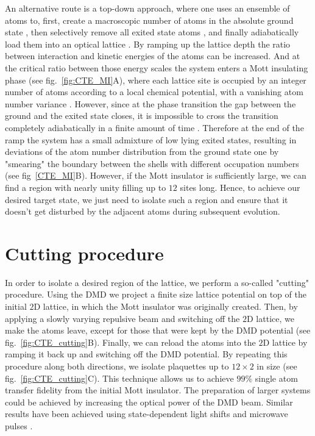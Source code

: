An alternative route is a top-down approach, where one uses an ensemble of atoms to, first, create a macroscopic number of atoms in the absolute ground state \cite{BEC, DFG}, then selectively remove all exited state atoms \cite{ammy's thesis}, and finally adiabatically load them into an optical lattice \cite{Greiner2002}. By ramping up the lattice depth the ratio between interaction and kinetic energies of the atoms can be increased. And at the critical ratio between those energy scales the system enters a Mott insulating phase (see fig.~\ref{fig:CTE_MI}A), where each lattice site is occupied by an integer number of atoms according to a local chemical potential, with a vanishing atom number variance \cite{Bakr2010, Bloch MI}. However, since at the phase transition the gap between the ground and the exited state closes, it is impossible to cross the transition completely adiabatically in a finite amount of time \cite{subir phase transition}. Therefore at the end of the ramp the system has a small admixture of low lying exited states, resulting in  deviations of the atom number distribution from the ground state one by "smearing" the boundary between the shells with different occupation numbers (see fig~\ref{CTE_MI}B). However, if the Mott insulator is sufficiently large, we can find a region with nearly unity filling up to $12$ sites long. Hence, to achieve our desired target state, we just need to isolate such a region and ensure that it doesn't get disturbed by the adjacent atoms during subsequent evolution.

\section{Cutting procedure}

In order to isolate a desired region of the lattice, we perform a so-called "cutting" procedure. Using the DMD we project a finite size lattice potential on top of the initial $2\mathrm{D}$ lattice, in which the Mott insulator was originally created. Then, by applying a slowly varying repulsive beam and switching off the $2\mathrm{D}$ lattice, we make the atoms leave, except for those that were kept by the DMD potential (see fig.~\ref{fig:CTE_cutting}B). Finally, we can reload the atoms into the $2\mathrm{D}$ lattice by ramping it back up and switching off the DMD potential. By repeating this procedure along both directions, we isolate plaquettes up to $12\times2$ in size (see fig.~\ref{fig:CTE_cutting}C). This technique allows us to achieve $99\%$ single atom transfer fidelity from the initial Mott insulator. The preparation of larger systems could be achieved by increasing the optical power of the DMD beam. Similar results have been achieved using state-dependent light shifts and microwave pulses \cite{Bloch single site addresing}.

